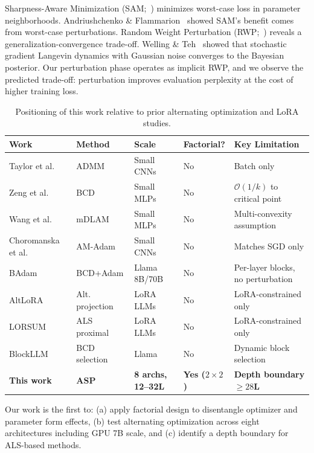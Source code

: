 \documentclass[11pt]{article}
\begin{document}
Sharpness-Aware Minimization (SAM;~\cite{foret2021sharpness}) minimizes worst-case loss in parameter neighborhoods. Andriushchenko \& Flammarion~\cite{andriushchenko2022towards} showed SAM's benefit comes from worst-case perturbations. Random Weight Perturbation (RWP;~\cite{li2024revisiting}) reveals a generalization-convergence trade-off. Welling \& Teh~\cite{welling2011bayesian} showed that stochastic gradient Langevin dynamics with Gaussian noise converges to the Bayesian posterior. Our perturbation phase operates as implicit RWP, and we observe the predicted trade-off: perturbation improves evaluation perplexity at the cost of higher training loss.

\begin{table}[t]
\centering
\caption{Positioning of this work relative to prior alternating optimization and LoRA studies.}
\begin{tabular}{@{}lllll@{}}
\toprule
\textbf{Work} & \textbf{Method} & \textbf{Scale} & \textbf{Factorial?} & \textbf{Key Limitation} \\
\midrule
Taylor et al.~\cite{taylor2016training} & ADMM & Small CNNs & No & Batch only \\
Zeng et al.~\cite{zeng2019global} & BCD & Small MLPs & No & $\mathcal{O}(1/k)$ to critical point \\
Wang et al.~\cite{wang2018accelerated} & mDLAM & Small MLPs & No & Multi-convexity assumption \\
Choromanska et al.~\cite{choromanska2019beyond} & AM-Adam & Small CNNs & No & Matches SGD only \\
BAdam~\cite{luo2024badam} & BCD+Adam & Llama 8B/70B & No & Per-layer blocks, no perturbation \\
AltLoRA~\cite{almansoori2025altlora} & Alt. projection & LoRA LLMs & No & LoRA-constrained only \\
LORSUM~\cite{almansoori2026lorsum} & ALS proximal & LoRA LLMs & No & LoRA-constrained only \\
BlockLLM~\cite{blockllm2025} & BCD selection & Llama & No & Dynamic block selection \\
\textbf{This work} & \textbf{ASP} & \textbf{8 archs, 12--32L} & \textbf{Yes ($2\times2$)} & \textbf{Depth boundary $\geq 28$L} \\
\bottomrule
\end{tabular}
\end{table}

Our work is the first to: (a) apply factorial design to disentangle optimizer and parameter form effects, (b) test alternating optimization across eight architectures including GPU 7B scale, and (c) identify a depth boundary for ALS-based methods.
\end{document}
